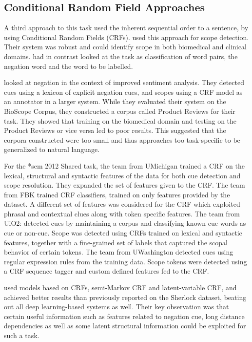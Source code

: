 \documentclass[10pt, a4paper]{article}
\begin{document}
\subsection{Conditional Random Field Approaches}
A third approach to this task used the inherent sequential order to a sentence, by using Conditional Random Fields (CRFs).  used this approach for scope detection. Their system was robust and could identify scope in both biomedical and clinical domains.  had in contrast looked at the task as classification of word pairs, the negation word and the word to be labelled.
\par {} looked at negation in the context of improved sentiment analysis. They detected cues using a lexicon of explicit negation cues, and scopes using a CRF model as an annotator in a larger system. While they evaluated their system on the BioScope Corpus, they constructed a corpus called Product Reviews for their task. They showed that training on the biomedical domain and testing on the Product Reviews or vice versa led to poor results. This suggested that the corpora constructed were too small and thus approaches too task-specific to be generalized to natural language.
\par For the *sem 2012 Shared task, the team from UMichigan \cite{abu-jbara-radev-2012-umichigan} trained a CRF on the lexical, structural and syntactic features of the data for both cue detection and scope resolution. They expanded the set of features given to the CRF. The team from FBK \cite{chowdhury-2012-fbk} trained CRF classifiers, trained on only features provided by the dataset. A different set of features was considered for the CRF which exploited phrasal and contextual clues along with token specific features. The team from UiO2: \cite{lapponi-etal-2012-uio} detected cues by maintaining a corpus and classifying known cue words as cue or non-cue. Scope was detected using CRFs trained on lexical and syntactic features, together with a fine-grained set of labels that captured the scopal behavior of certain tokens. The team from UWashington \cite{white-2012-uwashington} detected cues using regular expression rules from the training data. Scope tokens were detected using a CRF sequence tagger and custom defined features fed to the CRF.
\par {} used models based on CRFs, semi-Markov CRF and latent-variable CRF, and achieved better results than previously reported on the Sherlock dataset, beating out all deep learning-based systems as well. Their key observation was that certain useful information such as features related to negation cue, long distance dependencies as well as some latent structural information could be exploited for such a task.
\end{document}
